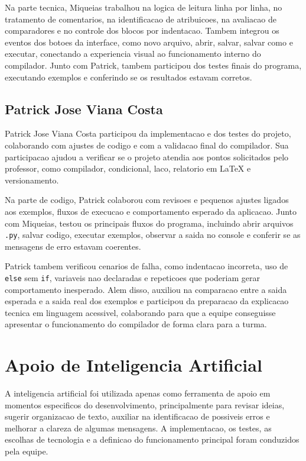 \documentclass[12pt,a4paper]{article}
\begin{document}
Na parte tecnica, Miqueias trabalhou na logica de leitura linha por linha, no tratamento de comentarios, na identificacao de atribuicoes, na avaliacao de comparadores e no controle dos blocos por indentacao. Tambem integrou os eventos dos botoes da interface, como novo arquivo, abrir, salvar, salvar como e executar, conectando a experiencia visual ao funcionamento interno do compilador. Junto com Patrick, tambem participou dos testes finais do programa, executando exemplos e conferindo se os resultados estavam corretos.

\subsection*{Patrick Jose Viana Costa}

Patrick Jose Viana Costa participou da implementacao e dos testes do projeto, colaborando com ajustes de codigo e com a validacao final do compilador. Sua participacao ajudou a verificar se o projeto atendia aos pontos solicitados pelo professor, como compilador, condicional, laco, relatorio em LaTeX e versionamento.

Na parte de codigo, Patrick colaborou com revisoes e pequenos ajustes ligados aos exemplos, fluxos de execucao e comportamento esperado da aplicacao. Junto com Miqueias, testou os principais fluxos do programa, incluindo abrir arquivos \texttt{.py}, salvar codigo, executar exemplos, observar a saida no console e conferir se as mensagens de erro estavam coerentes.

Patrick tambem verificou cenarios de falha, como indentacao incorreta, uso de \texttt{else} sem \texttt{if}, variaveis nao declaradas e repeticoes que poderiam gerar comportamento inesperado. Alem disso, auxiliou na comparacao entre a saida esperada e a saida real dos exemplos e participou da preparacao da explicacao tecnica em linguagem acessivel, colaborando para que a equipe conseguisse apresentar o funcionamento do compilador de forma clara para a turma.

\section{Apoio de Inteligencia Artificial}

A inteligencia artificial foi utilizada apenas como ferramenta de apoio em momentos especificos do desenvolvimento, principalmente para revisar ideias, sugerir organizacao de texto, auxiliar na identificacao de possiveis erros e melhorar a clareza de algumas mensagens. A implementacao, os testes, as escolhas de tecnologia e a definicao do funcionamento principal foram conduzidos pela equipe.
\end{document}
